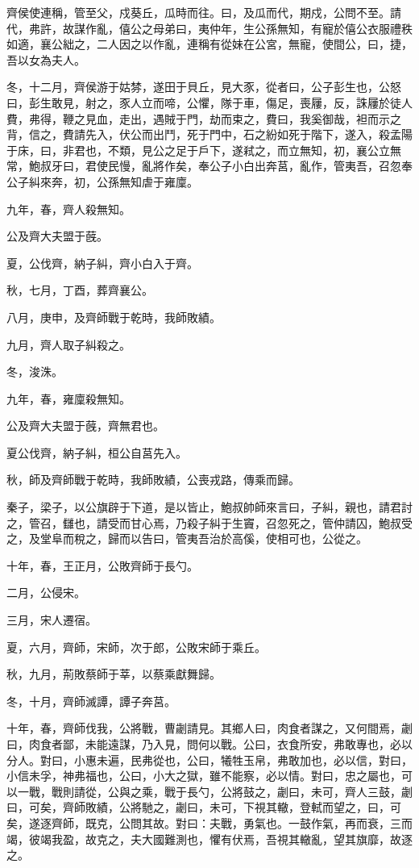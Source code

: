 \begin{pinyinscope}
齊侯使連稱，管至父，戍葵丘，瓜時而往。曰，及瓜而代，期戍，公問不至。請代，弗許，故謀作亂，僖公之母弟曰，夷仲年，生公孫無知，有寵於僖公衣服禮秩如適，襄公絀之，二人因之以作亂，連稱有從妹在公宮，無寵，使間公，曰，捷，吾以女為夫人。

冬，十二月，齊侯游于姑棼，遂田于貝丘，見大豕，從者曰，公子彭生也，公怒曰，彭生敢見，射之，豕人立而啼，公懼，隊于車，傷足，喪屨，反，誅屨於徒人費，弗得，鞭之見血，走出，遇賊于門，劫而束之，費曰，我奚御哉，袒而示之背，信之，費請先入，伏公而出鬥，死于門中，石之紛如死于階下，遂入，殺孟陽于床，曰，非君也，不類，見公之足于戶下，遂弒之，而立無知，初，襄公立無常，鮑叔牙曰，君使民慢，亂將作矣，奉公子小白出奔莒，亂作，管夷吾，召忽奉公子糾來奔，初，公孫無知虐于雍廩。

九年，春，齊人殺無知。

公及齊大夫盟于蔇。

夏，公伐齊，納子糾，齊小白入于齊。

秋，七月，丁酉，葬齊襄公。

八月，庚申，及齊師戰于乾時，我師敗績。

九月，齊人取子糾殺之。

冬，浚洙。

九年，春，雍廩殺無知。

公及齊大夫盟于蔇，齊無君也。

夏公伐齊，納子糾，桓公自莒先入。

秋，師及齊師戰于乾時，我師敗績，公喪戎路，傳乘而歸。

秦子，梁子，以公旗辟于下道，是以皆止，鮑叔帥師來言曰，子糾，親也，請君討之，管召，讎也，請受而甘心焉，乃殺子糾于生竇，召忽死之，管仲請囚，鮑叔受之，及堂阜而稅之，歸而以告曰，管夷吾治於高傒，使相可也，公從之。

十年，春，王正月，公敗齊師于長勺。

二月，公侵宋。

三月，宋人遷宿。

夏，六月，齊師，宋師，次于郎，公敗宋師于乘丘。

秋，九月，荊敗蔡師于莘，以蔡乘獻舞歸。

冬，十月，齊師滅譚，譚子奔莒。

十年，春，齊師伐我，公將戰，曹劌請見。其鄉人曰，肉食者謀之，又何間焉，劌曰，肉食者鄙，未能遠謀，乃入見，問何以戰。公曰，衣食所安，弗敢專也，必以分人。對曰，小惠未遍，民弗從也，公曰，犧牲玉帛，弗敢加也，必以信，對曰，小信未孚，神弗福也，公曰，小大之獄，雖不能察，必以情。對曰，忠之屬也，可以一戰，戰則請從，公與之乘，戰于長勺，公將鼓之，劌曰，未可，齊人三鼓，劌曰，可矣，齊師敗績，公將馳之，劌曰，未可，下視其轍，登軾而望之，曰，可矣，遂逐齊師，既克，公問其故。對曰：夫戰，勇氣也。一鼓作氣，再而衰，三而竭，彼竭我盈，故克之，夫大國難測也，懼有伏焉，吾視其轍亂，望其旗靡，故逐之。


\end{pinyinscope}
